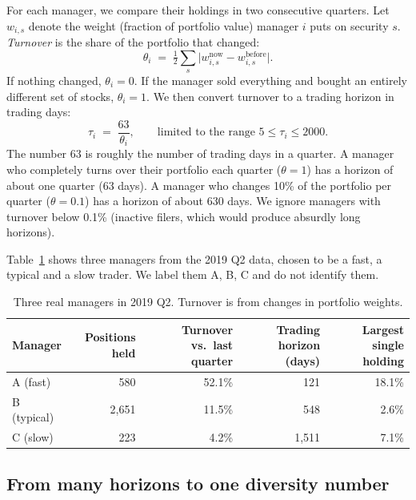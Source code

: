 For each manager, we compare their holdings in two consecutive quarters. Let $w_{i,s}$ denote the weight (fraction of portfolio value) manager $i$ puts on security $s$. \emph{Turnover} is the share of the portfolio that changed:
\begin{equation}
\theta_i \;=\; \tfrac12\sum_{s}\big|w_{i,s}^{\text{now}}-w_{i,s}^{\text{before}}\big| .
\label{eq:turnover}
\end{equation}
If nothing changed, $\theta_i=0$. If the manager sold everything and bought an entirely different set of stocks, $\theta_i=1$. We then convert turnover to a trading horizon in trading days:
\begin{equation}
\tau_i \;=\; \frac{63}{\theta_i}, \qquad\text{limited to the range } 5\le \tau_i\le 2000 .
\label{eq:tau}
\end{equation}
The number 63 is roughly the number of trading days in a quarter. A manager who completely turns over their portfolio each quarter ($\theta=1$) has a horizon of about one quarter (63 days). A manager who changes 10\% of the portfolio per quarter ($\theta=0.1$) has a horizon of about 630 days. We ignore managers with turnover below 0.1\% (inactive filers, which would produce absurdly long horizons).

\begin{example}
Table~\ref{tab:example} shows three managers from the 2019 Q2 data, chosen to be a fast, a typical and a slow trader. We label them A, B, C and do not identify them.
\end{example}

\begin{table}[htbp]
\centering
\caption{Three real managers in 2019 Q2. Turnover is from changes in portfolio weights.}
\label{tab:example}
\begin{tabular}{lrrrr}
\toprule
Manager & Positions held & Turnover vs.\ last quarter & Trading horizon (days) & Largest single holding\\
\midrule
A (fast) & 580 & 52.1\% & 121 & 18.1\%\\
B (typical) & 2{,}651 & 11.5\% & 548 & 2.6\%\\
C (slow) & 223 & 4.2\% & 1{,}511 & 7.1\%\\
\bottomrule
\end{tabular}
\end{table}

\subsection{From many horizons to one diversity number}

